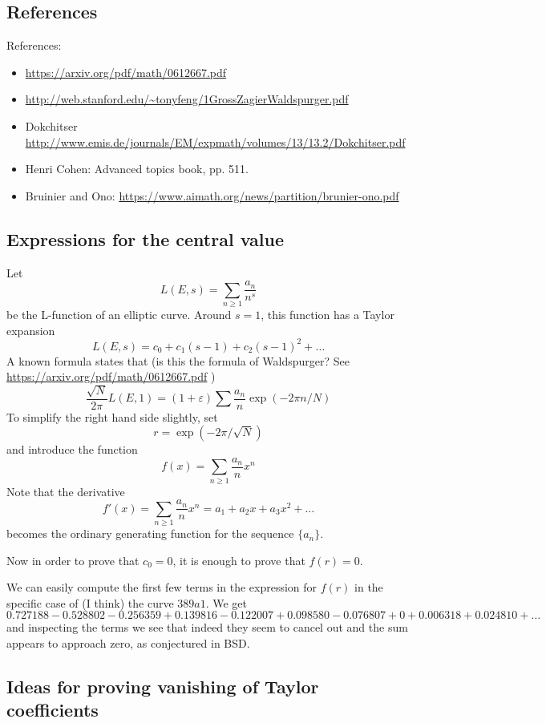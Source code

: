 \documentclass[paper=a4, fontsize=11pt]{scrartcl} %
\numberwithin{equation}{section} %
\numberwithin{figure}{section} %
\numberwithin{table}{section} %
\begin{document}
\subsection{References}

References:

\begin{itemize}
\item \url{https://arxiv.org/pdf/math/0612667.pdf}
\item \url{http://web.stanford.edu/~tonyfeng/1GrossZagierWaldspurger.pdf}
\item Dokchitser \url{http://www.emis.de/journals/EM/expmath/volumes/13/13.2/Dokchitser.pdf}
\item Henri Cohen: Advanced topics book, pp. 511.
\item Bruinier and Ono: \url{https://www.aimath.org/news/partition/brunier-ono.pdf}
\end{itemize}


\subsection{Expressions for the central value}

Let
$$L(E, s) = \sum_{n \geq 1} \frac{a_n}{n^s}$$
be the L-function of an elliptic curve. Around $s=1$, this function has a Taylor expansion
$$ L(E, s) = c_0 + c_1 (s-1) + c_2 (s-1)^2 + \ldots  $$
A known formula states that (is this the formula of Waldspurger? See \url{https://arxiv.org/pdf/math/0612667.pdf} )
$$ \frac{\sqrt{N}}{2 \pi} L(E, 1) = (1 + \varepsilon) \sum \frac{a_n}{n} \exp(-2 \pi n / N)  $$
To simplify the right hand side slightly, set
$$ r = \exp(-2 \pi / \sqrt{N})  $$
and introduce the function
$$  f(x) = \sum_{n \geq 1} \frac{a_n}{n} x^n  $$
Note that the derivative
$$  f'(x) = \sum_{n \geq 1} \frac{a_n}{n} x^n  = a_1 + a_2 x + a_3 x^2 + \ldots  $$
becomes the ordinary generating function for the sequence $\{ a_n \}$.

Now in order to prove that $c_0 = 0$, it is enough to prove that $f(r) = 0$.

We can easily compute the first few terms in the expression for $f(r)$ in the specific case of (I think) the curve $389a1$. We get
$$ 0.727188 - 0.528802 - 0.256359 + 0.139816 - 0.122007 + 0.098580 - 0.076807 + 0 + 0.006318 + 0.024810 + \ldots   $$
and inspecting the terms we see that indeed they seem to cancel out and the sum appears to approach zero, as conjectured in BSD.

\subsection{Ideas for proving vanishing of Taylor coefficients}
\end{document}
